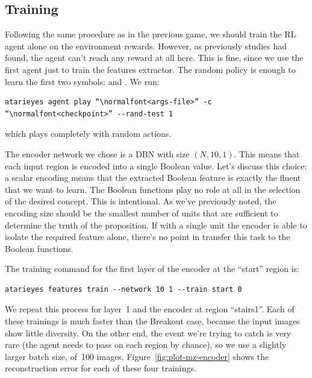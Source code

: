 \subsection{Training}

Following the same procedure as in the previous game, we should train the RL
agent alone on the environment rewards. However, as previously studies had
found, the agent can't reach any reward at all here. This is fine, since we
use the first agent just to train the features extractor. The random policy is
enough to learn the first two symbols:  and .
We run:
\begin{verbatim}
atarieyes agent play “\normalfont<args-file>” -c “\normalfont<checkpoint>” --rand-test 1
\end{verbatim}
which plays completely with random actions.

The encoder network we chose is a DBN with size $(N, 10, 1)$. This means that
each input region is encoded into a single Boolean value. Let's discuss this
choice: a scalar encoding means that the extracted Boolean feature is exactly
the fluent that we want to learn. The Boolean functions play no role at all in
the selection of the desired concept. This is intentional. As we've previously
noted, the encoding size should be the smallest number of units that are
sufficient to determine the truth of the proposition. If with a single unit
the encoder is able to isolate the required feature alone, there's no point in
transfer this task to the Boolean functions.

The training command for the first layer of the encoder at the ``start''
region is:
\begin{verbatim}
atarieyes features train --network 10 1 --train start 0
\end{verbatim}
We repeat this process for layer~1 and the encoder at region ``stairs1''.
Each of these trainings is much faster than the Breakout case, because the
input images show little diversity. On the other end, the event we're trying
to catch is very rare (the agent needs to pass on each region by chance), so
we use a slightly larger batch size, of~100 images.
Figure~\ref{fig:plot-mz-encoder} shows the reconstruction error for each of
these four trainings.

